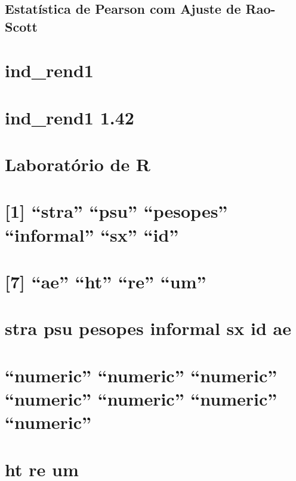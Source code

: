 \documentclass[]{book}
\theoremstyle{definition}
\theoremstyle{definition}
\theoremstyle{definition}
\theoremstyle{remark}
\begin{document}
\subsection{Estatística de Pearson com Ajuste de
Rao-Scott}\label{estatistica-de-pearson-com-ajuste-de-rao-scott}

\section{ind\_rend1}\label{ind_rend1}

\section{ind\_rend1 1.42}\label{ind_rend1-1.42}

\section{Laboratório de R}\label{laboratorio-de-r-5}

\section{\texorpdfstring{{[}1{]} ``stra'' ``psu'' ``pesopes''
``informal'' ``sx''
``id''}{{[}1{]} stra psu pesopes informal sx id}}\label{stra-psu-pesopes-informal-sx-id-1}

\section{\texorpdfstring{{[}7{]} ``ae'' ``ht'' ``re''
``um''}{{[}7{]} ae ht re um}}\label{ae-ht-re-um-1}

\section{stra psu pesopes informal sx id
ae}\label{stra-psu-pesopes-informal-sx-id-ae-1}

\section{\texorpdfstring{``numeric'' ``numeric'' ``numeric'' ``numeric''
``numeric'' ``numeric''
``numeric''}{numeric numeric numeric numeric numeric numeric numeric}}\label{numeric-numeric-numeric-numeric-numeric-numeric-numeric-1}

\section{ht re um}\label{ht-re-um-1}
\end{document}
